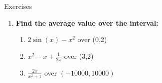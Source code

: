 \documentclass[../revisedmain.tex]{subfiles}
\begin{document}
	\newpage
	\begin{center}
		\LARGE Exercises
	\end{center}
	\begin{enumerate}
		\item \textbf{Find the average value over the interval:}
		\begin{enumerate}
			\item $2\sin(x)-x^2$ over (0,2)
			\item $x^2-x+\frac{1}{2x}$ over (3,2)
			\item $\displaystyle\frac{2x}{x^2+1}$ over $(-10000,10000)$
		\end{enumerate}
	\end{enumerate}
\end{document}
